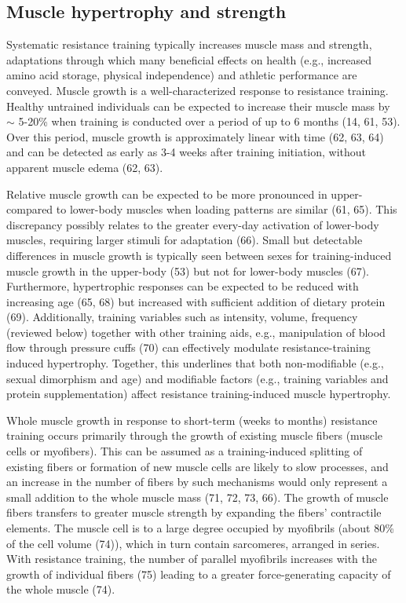 \documentclass[twoside,10pt]{gihclass} %
\begin{document}
\hypertarget{muscle-hypertrophy-and-strength}{%
\subsection{Muscle hypertrophy and strength}\label{muscle-hypertrophy-and-strength}}

Systematic resistance training typically increases muscle mass and strength, adaptations through which many beneficial effects on health (e.g., increased amino acid storage, physical independence) and athletic performance are conveyed.
Muscle growth is a well-characterized response to resistance training.
Healthy untrained individuals can be expected to increase their muscle mass by \(\sim\) 5-20\% when training is conducted over a period of up to 6 months
(14, 61, 53).
Over this period, muscle growth is approximately linear with time
(62, 63, 64)
and can be detected as early as 3-4 weeks after training initiation, without apparent muscle edema
(62, 63).

Relative muscle growth can be expected to be more pronounced in upper- compared to lower-body muscles when loading patterns are similar
(61, 65).
This discrepancy possibly relates to the greater every-day activation of lower-body muscles, requiring larger stimuli for adaptation
(66).
Small but detectable differences in muscle growth is typically seen between sexes for training-induced muscle growth in the upper-body
(53)
but not for lower-body muscles
(67).
Furthermore, hypertrophic responses can be expected to be reduced with increasing age
(65, 68)
but increased with sufficient addition of dietary protein
(69).
Additionally, training variables such as intensity, volume, frequency (reviewed below) together with other training aids, e.g., manipulation of blood flow through pressure cuffs
(70)
can effectively modulate resistance-training induced hypertrophy.
Together, this underlines that both non-modifiable (e.g., sexual dimorphism and age) and modifiable factors (e.g., training variables and protein supplementation) affect resistance training-induced muscle hypertrophy.

Whole muscle growth in response to short-term (weeks to months) resistance training occurs primarily through the growth of existing muscle fibers (muscle cells or myofibers).
This can be assumed as a training-induced splitting of existing fibers or formation of new muscle cells are likely to slow processes, and an increase in the number of fibers by such mechanisms would only represent a small addition to the whole muscle mass
(71, 72, 73, 66).
The growth of muscle fibers transfers to greater muscle strength by expanding the fibers' contractile elements.
The muscle cell is to a large degree occupied by myofibrils
(about 80\% of the cell volume
(74)),
which in turn contain sarcomeres, arranged in series.
With resistance training, the number of parallel myofibrils increases with the growth of individual fibers
(75)
leading to a greater force-generating capacity of the whole muscle
(74).
\end{document}

